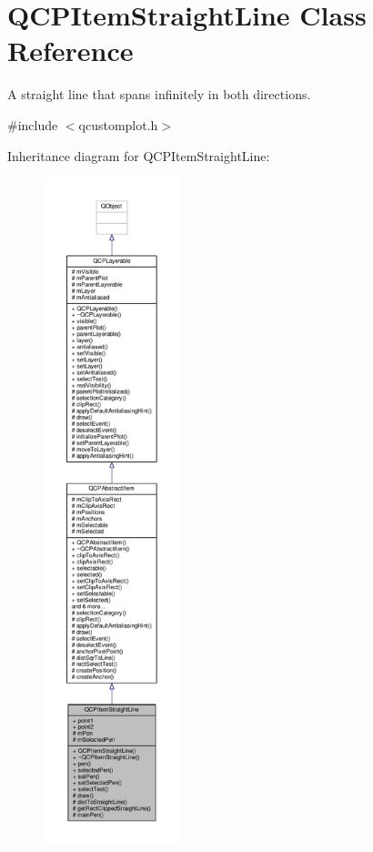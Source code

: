 \hypertarget{class_q_c_p_item_straight_line}{}\section{Q\+C\+P\+Item\+Straight\+Line Class Reference}
\label{class_q_c_p_item_straight_line}


A straight line that spans infinitely in both directions.  




{\ttfamily \#include $<$qcustomplot.\+h$>$}



Inheritance diagram for Q\+C\+P\+Item\+Straight\+Line\+:\nopagebreak
\begin{figure}[H]
\begin{center}
\leavevmode
\includegraphics[height=550pt]{class_q_c_p_item_straight_line__inherit__graph}
\end{center}
\end{figure}


